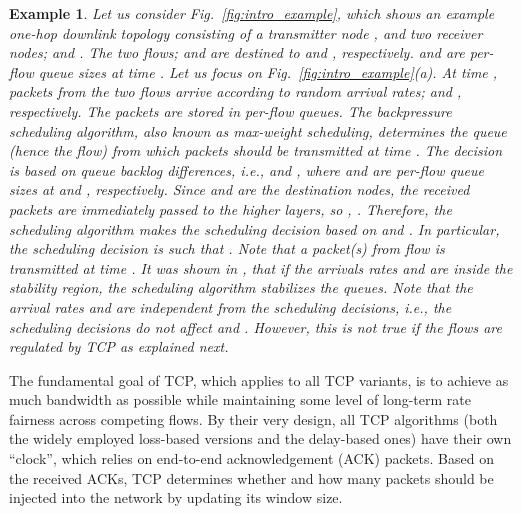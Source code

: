 \documentclass[conference]{IEEEtran}
\newcommand{\ie}{{\em i.e., }}
\newtheorem{example}{Example}
\begin{document}
\begin{example}\label{ex1}
Let us consider Fig.~\ref{fig:intro_example}, which shows an example one-hop downlink topology consisting of a transmitter node , and two receiver nodes;  and . The two flows;  and  are destined to  and , respectively.  and  are per-flow queue sizes at time . Let us focus on Fig.~\ref{fig:intro_example}(a). At time , packets from the two flows arrive according to random arrival rates;  and , respectively. The packets are stored in per-flow queues.
The backpressure scheduling algorithm, also known as max-weight scheduling, determines the queue (hence the flow) from which packets should be transmitted at time . The decision is based on queue backlog differences, \ie  and , where  and  are per-flow queue sizes at  and , respectively. Since  and  are the destination nodes, the received packets are immediately passed to the higher layers, so , . Therefore, the scheduling algorithm makes the scheduling decision based on  and . In particular, the scheduling decision is  such that . Note that a packet(s) from flow  is transmitted at time . It was shown in \cite{tass_eph1}, \cite{tass_eph2} that if the arrivals rates  and  are inside the stability region, the scheduling algorithm stabilizes the queues. Note that the arrival rates  and  are independent from the scheduling decisions, \ie the scheduling decisions do not affect  and . However, this is not true if the flows are regulated by TCP as explained next.\hfill 
\end{example}

The fundamental goal of TCP, which applies to all TCP variants, is to achieve as much bandwidth as possible while maintaining some level of long-term rate fairness across competing flows. By their very design, all TCP algorithms (both the widely employed loss-based versions and the delay-based ones) have their own ``clock'', which relies on end-to-end acknowledgement (ACK) packets. Based on the received ACKs, TCP determines whether and how many packets should be injected into the network by updating its window size.
\end{document}
